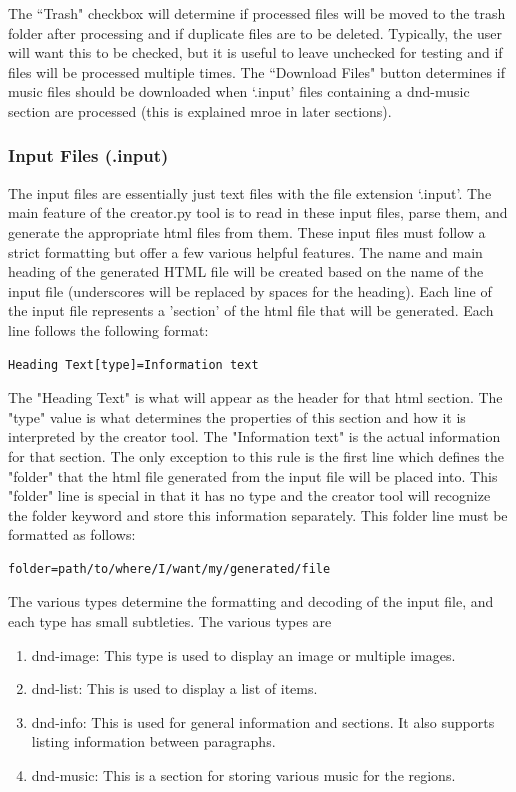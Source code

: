 The ``Trash" checkbox will determine if processed files will be moved to the trash folder after processing and if duplicate files are to be deleted. Typically, the user will want this to be checked, but it is useful to leave unchecked for testing and if files will be processed multiple times. The ``Download Files" button determines if music files should be downloaded when `.input' files containing a dnd-music section are processed (this is explained mroe in later sections).

\subsubsection{Input Files (.input)}

The input files are essentially just text files with the file extension `.input'. The main feature of the creator.py tool is to read in these input files, parse them, and generate the appropriate html files from them. These input files must follow a strict formatting but offer a few various helpful features. The name and main heading of the generated HTML file will be created based on the name of the input file (underscores will be replaced by spaces for the heading). Each line of the input file represents a 'section' of the html file that will be generated. Each line follows the following format:
\begin{lstlisting}
Heading Text[type]=Information text
\end{lstlisting}
The "Heading Text" is what will appear as the header for that html section. The "type" value is what determines the properties of this section and how it is interpreted by the creator tool. The "Information text" is the actual information for that section. The only exception to this rule is the first line which defines the "folder" that the html file generated from the input file will be placed into. This "folder" line is special in that it has no type and the creator tool will recognize the folder keyword and store this information separately. This folder line must be formatted as follows:
\begin{lstlisting}
folder=path/to/where/I/want/my/generated/file
\end{lstlisting}
The various types determine the formatting and decoding of the input file, and each type has small subtleties. The various types are
\begin{enumerate}
	\item dnd-image: This type is used to display an image or multiple images.
 	\item dnd-list: This is used to display a list of items.
 	\item dnd-info: This is used for general information and sections. It also supports listing information between paragraphs.
  	\item dnd-music: This is a section for storing various music for the regions.
\end{enumerate}

